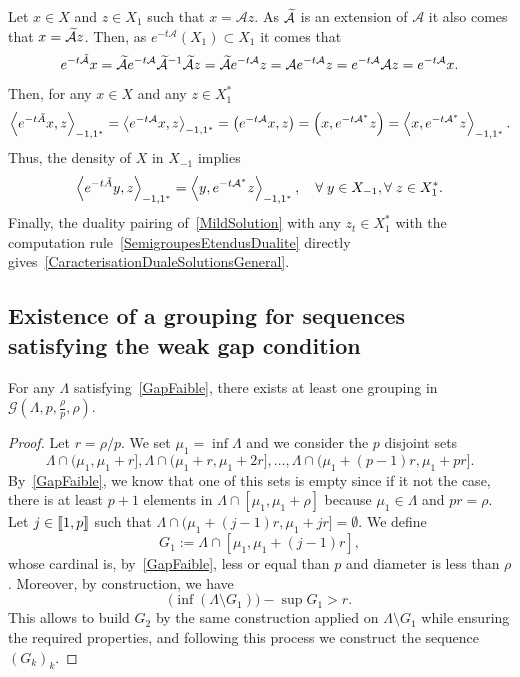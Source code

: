 \documentclass[10pt]{amsart}
\theoremstyle{definition}\newtheorem{defi}[theo]{Definition}\newtheorem{rema}[theo]{Remark}\newtheorem{exam}[theo]{Example}\newtheorem{exem}[theo]{Example}\newtheorem{nota}[theo]{Notation}
\newcommand{\llbracket}{\mathopen{[\mkern -2.7mu[}}
\newcommand{\rrbracket}{\mathclose{]\mkern -2.7mu]}}
\newcommand{\inter}[2]{\llbracket #1,#2 \rrbracket}
\newcommand\A{\mathcal{A}}
\newcommand\As{\mathcal{A}^*}
\newcommand{\Xun}{X_1}
\newcommand{\Xuns}{X_1^*}
\newcommand{\Xmun}{X_{-1}}
\newcommand{\psX}[2]{\left(#1, #2 \right)}
\newcommand{\dualX}[2]{\left\langle #1, #2 \right\rangle_{-1,1^*}}
\let\oldtilde\tilde
\renewcommand*{\tilde}[1]{\mathchoice{\widetilde{#1}}{\widetilde{#1}}{\oldtilde{#1}}{\oldtilde{#1}}}\let\oldexists\exists
\renewcommand*{\exists}{\mathrel{\oldexists}}
\let\oldforall\forall
\renewcommand*{\forall}{\mathrel{\oldforall}}
\begin{document}
Let $x \in X$ and $z \in \Xun$ such that $x= \A z$. As $\tilde{\A}$ is an extension of $\A$ it also comes that $x = \tilde{\A}z$. Then, as $e^{-t \A} (\Xun) \subset \Xun$ it comes that
\[
e^{-t \tilde{\A}}x = \tilde{\A} e^{-t \A} \tilde{\A}^{-1} \tilde{\A} z = \tilde{\A} e^{-t \A} z = \A e^{-t \A} z = e^{-t \A} \A z = e^{-t \A}x.
\]
Then, for any $x \in X$ and any $z \in \Xuns$
\[
\dualX{e^{-t \tilde{A}} x }{z} = \dualX{e^{-t\A} x}{z} = \psX{e^{-t\A}x}{z} = \psX{x}{e^{-t \As} z} = \dualX{x}{e^{-t \As}z}.
\]
Thus, the density of $X$ in $\Xmun$ implies
\begin{equation}\label{SemigroupesEtendusDualite}
\dualX{e^{-t \tilde{A}} y }{z} = \dualX{y}{e^{-t \As}z}, \quad \forall y \in \Xmun, \forall z \in \Xuns.
\end{equation}
Finally, the duality pairing of~\eqref{MildSolution} with any $z_t \in \Xuns$ with the computation rule~\eqref{SemigroupesEtendusDualite} directly gives~\eqref{CaracterisationDualeSolutionsGeneral}.


\subsection{Existence of a grouping for sequences satisfying the weak gap condition}

\begin{prop}\label{Prop:Groupements}
For any $\Lambda$ satisfying~\eqref{GapFaible}, there exists at least one grouping in $\mathcal{G} \left(\Lambda, p,\frac{\rho}{p},\rho \right)$.
\end{prop}

\begin{proof}
Let $r=\rho/p$. We set $\mu_1=\inf \Lambda$ and we consider the $p$ disjoint sets
\[
\Lambda\cap (\mu_1,\mu_1+r], \Lambda\cap (\mu_1+r,\mu_1+2r], \dotsc, \Lambda\cap (\mu_1+(p-1)r,\mu_1+pr].
\]
By~\eqref{GapFaible}, we know that one of this sets is empty since if it not the case, there is at least $p+1$ elements in $\Lambda\cap [\mu_1,\mu_1+\rho]$ because $\mu_1\in \Lambda$ and $pr=\rho$. Let $j\in \inter{1}{p}$ such that $\Lambda\cap (\mu_1+(j-1)r,\mu_1+jr]= \emptyset$. We define
\[
G_1:=\Lambda\cap [\mu_1, \mu_1+(j-1)r],
\]
whose cardinal is, by~\eqref{GapFaible}, less or equal than $p$ and diameter is less than $\rho$. Moreover, by construction, we have
\[
\big(\inf (\Lambda\setminus G_1) \big) - \sup G_1 > r.
\]
This allows to build $G_2$ by the same construction applied on $\Lambda\setminus G_1$ while ensuring the required properties, and following this process we construct the sequence $(G_k)_k$.
\end{proof}
\end{document}
